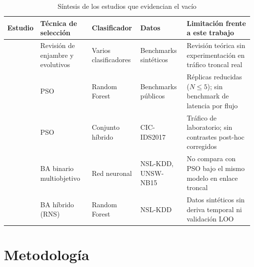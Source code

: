\documentclass[11pt,a4paper]{article}
\newcommand{\tabfont}{\small\setstretch{1}}
\begin{document}
\begin{table}[ht]
\tabfont
\caption{Síntesis de los estudios que evidencian el vacío}
\label{tab:sintesis}
\begin{tabularx}{\textwidth}{@{}p{2.6cm}p{3.2cm}p{2.8cm}p{2.3cm}X@{}}
\toprule
Estudio & Técnica de selección & Clasificador & Datos & Limitación frente a este trabajo \\
\midrule
\textcite{thakkar2020} & Revisión de enjambre y evolutivos & Varios clasificadores & Benchmarks sintéticos & Revisión teórica sin experimentación en tráfico troncal real \\
\textcite{safa2024} & PSO & Random Forest & Benchmarks públicos & Réplicas reducidas ($N \le 5$); sin benchmark de latencia por flujo \\
\textcite{louk2022} & PSO & Conjunto híbrido & CIC-IDS2017 & Tráfico de laboratorio; sin contrastes post-hoc corregidos \\
\textcite{ghanem2022} & BA binario multiobjetivo & Red neuronal & NSL-KDD, UNSW-NB15 & No compara con PSO bajo el mismo modelo en enlace troncal \\
\textcite{saheed2024} & BA híbrido (RNS) & Random Forest & NSL-KDD & Datos sintéticos sin deriva temporal ni validación LOO \\
\bottomrule
\end{tabularx}
\end{table}

\section{Metodología}
\end{document}
